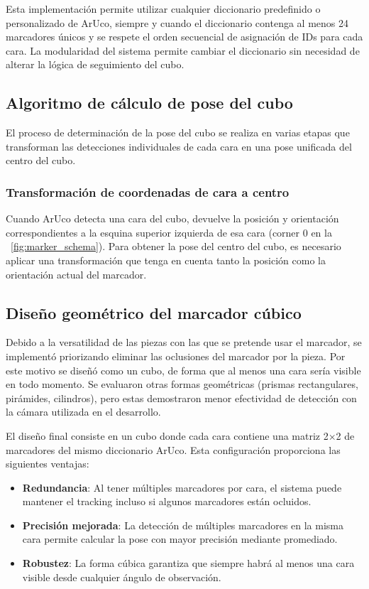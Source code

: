 Esta implementación permite utilizar cualquier diccionario predefinido o personalizado de ArUco, siempre y cuando el diccionario contenga al menos 24 marcadores únicos y se respete el orden secuencial de asignación de IDs para cada cara. La modularidad del sistema permite cambiar el diccionario sin necesidad de alterar la lógica de seguimiento del cubo.

\subsection{Algoritmo de cálculo de pose del cubo}
\label{subsec:algoritmo_pose}

El proceso de determinación de la pose del cubo se realiza en varias etapas que transforman las detecciones individuales de cada cara en una pose unificada del centro del cubo.

\subsubsection{Transformación de coordenadas de cara a centro}
Cuando ArUco detecta una cara del cubo, devuelve la posición y orientación correspondientes a la esquina superior izquierda de esa cara (corner 0 en la \figurename~\ref{fig:marker_schema}). Para obtener la pose del centro del cubo, es necesario aplicar una transformación que tenga en cuenta tanto la posición como la orientación actual del marcador.

\subsection{Diseño geométrico del marcador cúbico}

Debido a la versatilidad de las piezas con las que se pretende usar el marcador, se implementó priorizando eliminar las oclusiones del marcador por la pieza. Por este motivo se diseñó como un cubo, de forma que al menos una cara sería visible en todo momento. Se evaluaron otras formas geométricas (prismas rectangulares, pirámides, cilindros), pero estas demostraron menor efectividad de detección con la cámara utilizada en el desarrollo.

El diseño final consiste en un cubo donde cada cara contiene una matriz 2×2 de marcadores del mismo diccionario ArUco. Esta configuración proporciona las siguientes ventajas:

\begin{itemize}
    \item \textbf{Redundancia}: Al tener múltiples marcadores por cara, el sistema puede mantener el tracking incluso si algunos marcadores están ocluidos.
    \item \textbf{Precisión mejorada}: La detección de múltiples marcadores en la misma cara permite calcular la pose con mayor precisión mediante promediado.
    \item \textbf{Robustez}: La forma cúbica garantiza que siempre habrá al menos una cara visible desde cualquier ángulo de observación.
\end{itemize}


